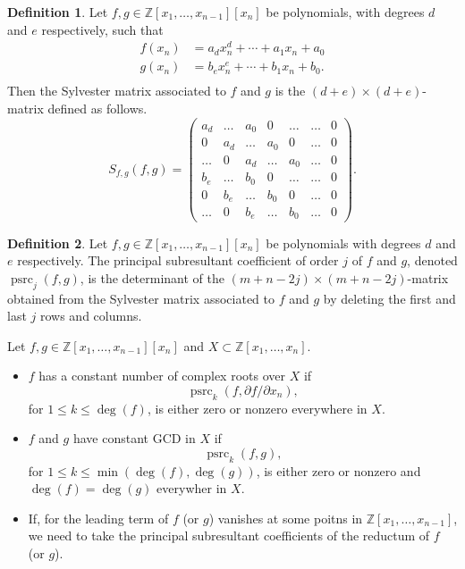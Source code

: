 \documentclass[
]{book}
\providecommand{\tightlist}{%
  \setlength{\itemsep}{0pt}\setlength{\parskip}{0pt}}
\theoremstyle{definition}
\newtheorem{definition}{Definition}[chapter]
\theoremstyle{definition}
\theoremstyle{definition}
\theoremstyle{definition}
\theoremstyle{remark}
\begin{document}
\begin{definition}
Let \(f,g \in \mathbb{Z}[x_1,\ldots,x_{n-1}][x_n]\) be polynomials, with degrees \(d\) and \(e\) respectively, such that
\begin{align*}
f(x_n) &= a_d x_n^d + \cdots + a_1 x_n + a_0 \\
g(x_n) &= b_e x_n^e + \cdots + b_1 x_n + b_0. \\
\end{align*}
Then the Sylvester matrix associated to \(f\) and \(g\) is the \((d + e) \times (d + e)\)-matrix defined as follows.
\[
S_{f,g}(f,g) = 
\begin{pmatrix}a_{d} & \ldots & a_{0} & 0 & \ldots & \ldots & 0\\
0 & a_{d} & \ldots & a_{0} & 0 & \ldots & 0\\
\ldots & 0 & a_{d} & \ldots & a_{0} & \ldots & 0\\
b_{e} & \ldots & b_{0} & 0 & \ldots & \ldots & 0\\
0 & b_{e} & \ldots & b_{0} & 0 & \ldots & 0\\
\ldots & 0 & b_{e} & \ldots & b_{0} & \ldots & 0
\end{pmatrix}.
\]
\end{definition}

\begin{definition}
Let \(f,g \in \mathbb{Z}[x_1,\ldots,x_{n-1}][x_n]\) be polynomials with degrees \(d\) and \(e\) respectively. The principal subresultant coefficient of order \(j\) of \(f\) and \(g\), denoted \(\operatorname{psrc}_j(f,g)\), is the determinant of the \((m + n - 2j) \times (m + n - 2j)\)-matrix obtained from the Sylvester matrix associated to \(f\) and \(g\) by deleting the first and last \(j\) rows and columns.
\end{definition}

Let \(f,g \in \mathbb{Z}[x_1,\ldots,x_{n-1}][x_n]\) and \(X \subset \mathbb{Z}[x_1,\ldots,x_n]\).

\begin{itemize}
\tightlist
\item
  \(f\) has a constant number of complex roots over \(X\) if
  \[
  \operatorname{psrc}_k(f, \partial f / \partial x_n),
  \]
  for \(1 \le k \le \deg(f)\), is either zero or nonzero everywhere in \(X\).
\item
  \(f\) and \(g\) have constant GCD in \(X\) if
  \[
  \operatorname{psrc}_k(f, g),
  \]
  for \(1 \le k \le \min(\deg(f),\deg(g))\), is either zero or nonzero and \(\deg(f) = \deg(g)\) everywher in \(X\).
\item
  If, for the leading term of \(f\) (or \(g\)) vanishes at some poitns in \(\mathbb{Z}[x_1,\ldots,x_{n-1}]\), we need to take the principal subresultant coefficients of the reductum of \(f\) (or \(g\)).
  \citep[pp36]{coste2000}
\end{itemize}
\end{document}
